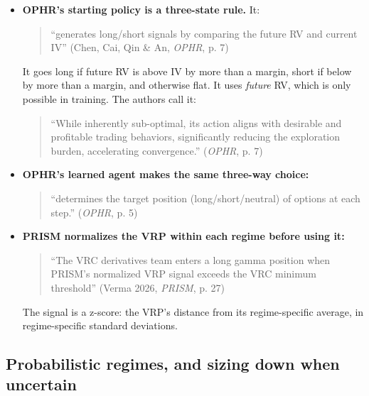 \documentclass{article}
\begin{document}
\begin{itemize}

\item \textbf{OPHR's starting policy is a three-state rule.} It:

\begin{quote}``generates long/\allowbreak{}short signals by comparing the future RV and current IV'' (Chen, Cai, Qin \& An, \emph{OPHR}, p. 7)\end{quote}

It goes long if future RV is above IV by more than a margin, short if below by more than a margin, and otherwise flat. It uses \emph{future} RV, which is only possible in training. The authors call it:

\begin{quote}``While inherently sub-optimal, its action aligns with desirable and profitable trading behaviors, significantly reducing the exploration burden, accelerating convergence.'' (\emph{OPHR}, p. 7)\end{quote}

\item \textbf{OPHR's learned agent makes the same three-way choice:}

\begin{quote}``determines the target position (long/\allowbreak{}short/\allowbreak{}neutral) of options at each step.'' (\emph{OPHR}, p. 5)\end{quote}

\item \textbf{PRISM normalizes the VRP within each regime before using it:}

\begin{quote}``The VRC derivatives team enters a long gamma position when PRISM's normalized VRP signal exceeds the VRC minimum threshold'' (Verma 2026, \emph{PRISM}, p. 27)\end{quote}

The signal is a z-score: the VRP's distance from its regime-specific average, in regime-specific standard deviations.

\end{itemize}

\subsection{Probabilistic regimes, and sizing down when uncertain}
\end{document}
